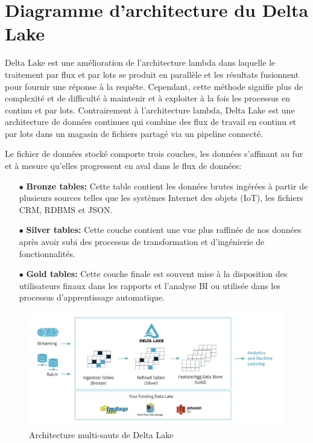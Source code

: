 \section{Diagramme d'architecture du Delta Lake}
\begin{flushleft}
Delta Lake est une amélioration de l'architecture lambda dans laquelle le traitement par flux et par lots se produit en parallèle et les résultats fusionnent pour fournir une réponse à la requête. Cependant, cette méthode signifie plus de complexité et de difficulté à maintenir et à exploiter à la fois les processus en continu et par lots. Contrairement à l'architecture lambda, Delta Lake est une architecture de données continues qui combine des flux de travail en continu et par lots dans un magasin de fichiers partagé via un pipeline connecté.
\end{flushleft}

Le fichier de données stocké comporte trois couches, les données s'affinant au fur et à mesure qu'elles progressent en aval dans le flux de données:

\begin{enumerate}
\item[$\bullet$] \textbf{Bronze tables:} Cette table contient les données brutes ingérées à partir de plusieurs sources telles que les systèmes Internet des objets (IoT), les fichiers CRM, RDBMS et JSON.
\item[$\bullet$] \textbf{Silver tables:} Cette couche contient une vue plus raffinée de nos données après avoir subi des processus de transformation et d'ingénierie de fonctionnalités.
\item[$\bullet$] \textbf{Gold tables:} Cette couche finale est souvent mise à la disposition des utilisateurs finaux dans les rapports et l'analyse BI ou utilisée dans les processus d'apprentissage automatique.
\end{enumerate}

\begin{figure}[htbp]
\centering
\includegraphics[width=\linewidth]{images/delta_lake_architecture.png}
\caption{Architecture multi-sauts de Delta Lake}\label{fig:delta-lake-architecture}
\end{figure}

